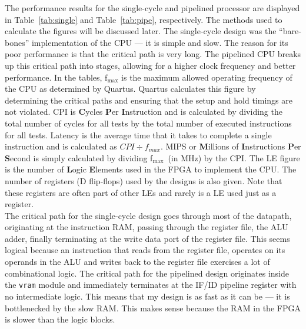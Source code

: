 \documentclass[12pt]{article}
\begin{document}
The performance results for the single-cycle and pipelined processor are displayed in Table~\ref{tab:single} and Table~\ref{tab:pipe}, respectively. The methods used to calculate the figures will be discussed later. The single-cycle design was the ``bare-bones'' implementation of the CPU --- it is simple and slow. The reason for its poor performance is that the critical path is very long. The pipelined CPU breaks up this critical path into stages, allowing for a higher clock frequency and better performance. In the tables, f$_{\textrm{max}}$ is the maximum allowed operating frequency of the CPU as determined by Quartus. Quartus calculates this figure by determining the critical paths and ensuring that the setup and hold timings are not violated. CPI is \textbf{C}ycles \textbf{P}er \textbf{I}nstruction and is calculated by dividing the total number of cycles for all tests by the total number of executed instructions for all tests. Latency is the average time that it takes to complete a single instruction and is calculated as $CPI \div f_{max}$. MIPS or \textbf{M}illions of \textbf{I}nstructions \textbf{P}er \textbf{S}econd is simply calculated by dividing f$_{\textrm{max}}$~(in MHz) by the CPI. The LE figure is the number of \textbf{L}ogic \textbf{E}lements used in the FPGA to implement the CPU. The number of registers (D flip-flops) used by the designs is also given. Note that these registers are often part of other LEs and rarely is a LE used just as a register.\\

The critical path for the single-cycle design goes through most of the datapath, originating at the instruction RAM, passing through the register file, the ALU adder, finally terminating at the write data port of the register file. This seems logical because an instruction that reads from the register file, operates on its operands in the ALU and writes back to the register file exercises a lot of combinational logic. The critical path for the pipelined design originates inside the \texttt{vram} module and immediately terminates at the IF/ID pipeline register with no intermediate logic. This means that my design is as fast as it can be --- it is bottlenecked by the slow RAM. This makes sense because the RAM in the FPGA is slower than the logic blocks.\\
\end{document}
